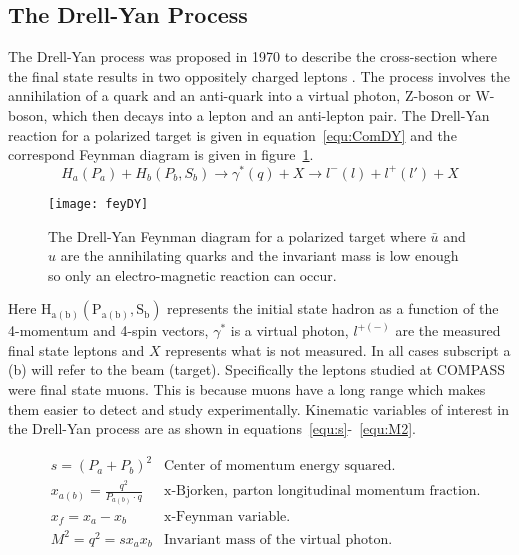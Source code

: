 \subsection{The Drell-Yan Process}

The Drell-Yan process was proposed in 1970 to describe the
cross-section where the final state results in two oppositely charged
leptons \cite{DY_process}.  The process involves the annihilation of a
quark and an anti-quark into a virtual photon, Z-boson or W-boson,
which then decays into a lepton and an anti-lepton pair.  The Drell-Yan reaction for a polarized target is given in
equation~\ref{equ:ComDY} and the correspond Feynman diagram is given
in figure~\ref{fig:fey_DY}.
%
\begin{equation}
  H_a(P_a) + H_b(P_b, S_b) \rightarrow \gamma ^*(q) + X \rightarrow
  l^-(l) + l^+(l') + X
  \label{equ:ComDY}
\end{equation}
%
\begin{figure}[h]
  \texttt{[image: feyDY]}
  \caption{}{The Drell-Yan Feynman diagram for a polarized
    target where $\bar{u}$ and $u$ are the annihilating quarks
    and the invariant mass is low enough so only an electro-magnetic
    reaction can occur.}
  \label{fig:fey_DY}
\end{figure}
%
Here $\mathrm{H}_{\mathrm{a(b)}}(\mathrm{P}_{\mathrm{a(b)}}, \mathrm{S}_{\mathrm{b}})$ represents the initial state hadron as
a function of the 4-momentum and 4-spin vectors, $\gamma^{*}$ is a virtual photon,
$l^{+(-)}$ are the measured final state leptons and $X$ represents
what is not measured.  In all cases subscript a (b) will refer to the
beam (target).  Specifically the leptons studied at COMPASS were final
state muons.  This is because muons have a long range which makes
them easier to detect and study experimentally. Kinematic variables
of interest in the Drell-Yan process are as shown in
equations~\ref{equ:s}-~\ref{equ:M2}.

\begin{subequations}
  \begin{align}
    &s = (P_a + P_b)^2 & \text{Center of momentum energy
      squared.}\label{equ:s}\\ &x_{a(b)} = \frac{q^2}{P_{a(b)} \cdot
      q} & \text{x-Bjorken, parton longitudinal momentum fraction.}
    \\ &x_f = x_a - x_b & \text{x-Feynman variable.}\\ &M^2 = q^2 =
    sx_ax_b & \text{Invariant mass of the virtual
      photon.}\label{equ:M2}
  \end{align}
  \label{equ:DYkin}
\end{subequations}

